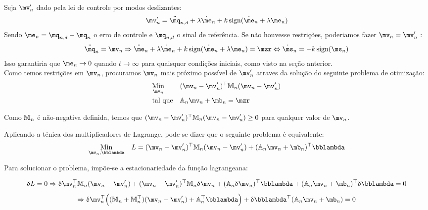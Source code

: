 Seja $\mv'_n$ dado pela lei de controle por modos deslizantes:
\begin{equation} \label{eq:SMControlowLasV1'}
\mv'_n = \ddot{\mq}_{n, d} + \lambda \dot{\me}_n + k \sign (\dot{\me}_n + \lambda \me_n)
\end{equation}
Sendo $ \me_n = \mq_{n,d} - \mq_n $ o erro de controle e $\mq_{n,d}$ o sinal de refer\^encia. Se n\~ao houvesse restri\c{c}\~oes, poderiamos fazer $ \mv_n = \mv'_n $ :
$$ \ddot{\mq}_n = \mv_n \Rightarrow  \ddot{\me}_n + \lambda \dot{\me}_n + k \sign (\dot{\me}_n + \lambda \me_n) = \mzr \Leftrightarrow \dot{\ms}_n = - k \sign(\ms_n)$$
Isso garantiria que $\me_n \rightarrow 0$ quando $t \rightarrow \infty$ para quaisquer condi\c{c}\~oes iniciais, como visto na se\c{c}\~ao anterior. \\

Como temos restri\c{c}\~oes em $\mv_n$, procuramos $\mv_n$ mais pr\'oximo poss\'ivel de $\mv'_n$ atraves da solu\c{c}\~ao do seguinte problema de otimiza\c{c}\~ao:
\begin{equation} \label{eq:Optimization}
\begin{aligned}
& \underset{\mv_n}{\text{Min}}
& & (\mv_n - \mv'_n)^\top \mM_n (\mv_n - \mv'_n) \\
& \text{tal que}
& & \mA_n \mv_n + \mb_n = \mzr
\end{aligned}
\end{equation}

Como $\mathbb{M}_n$ \'e n\~ao-negativa definida, temos que $(\mv_n - \mv'_n)^\top \mM_n (\mv_n - \mv'_n) \geq 0 $ para qualquer valor de $\mv_n$.

Aplicando a t\'enica dos multiplicadores de Lagrange, pode-se dizer que o seguinte problema \'e equivalente:
\begin{equation}
\begin{aligned}
& \underset{\mv_n, \mlambda}{\text{Min}}
& & L = (\mv_n - \mv'_n)^\top \mM_n (\mv_n - \mv'_n) + (\mA_n \mv_n + \mb_n)^\top \mlambda \\
\end{aligned}
\end{equation}


Para solucionar o problema, imp\~oe-se a estacionariedade da fun\c{c}\~ao lagrangeana:

$$ \dl L = 0 \Rightarrow \dl \mv_n^\top \mM_n (\mv_n - \mv'_n) + (\mv_n - \mv'_n)^\top \mM_n \dl \mv_n + (\mA_n \dl \mv_n)^\top \mlambda + (\mA_n \mv_n + \mb_n)^\top \dl \mlambda = 0 $$
$$ \Rightarrow \dl \mv_n^\top \Big( (\mM_n + \mM_n^\top)(\mv_n - \mv'_n) + \mA_n^\top \mlambda \Big) + \dl \mlambda^\top (\mA_n \mv_n + \mb_n) = 0 $$

